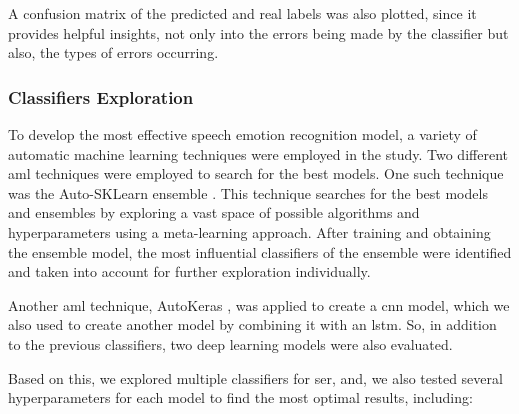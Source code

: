 A confusion matrix of the predicted and real labels was also plotted, since it provides helpful insights, not only into the errors being made by the classifier but also, the types of errors occurring.

\subsubsection{Classifiers Exploration}

To develop the most effective speech emotion recognition model, a variety of automatic machine learning techniques were employed in the study. Two different \ac{aml} techniques were employed to search for the best models. One such technique was the Auto-SKLearn ensemble \cite{feurerneurips15a}. This technique searches for the best models and ensembles by exploring a vast space of possible algorithms and hyperparameters using a meta-learning approach. After training and obtaining the ensemble model, the most influential classifiers of the ensemble were identified and taken into account for further exploration individually.

Another \ac{aml} technique, AutoKeras \cite{jin2019auto}, was applied to create a \ac{cnn} model, which we also used to create another model by combining it with an \ac{lstm}. So, in addition to the previous classifiers, two deep learning models were also evaluated.

Based on this, we explored multiple classifiers for \ac{ser}, and, we also tested several hyperparameters for each model to find the most optimal results, including:

